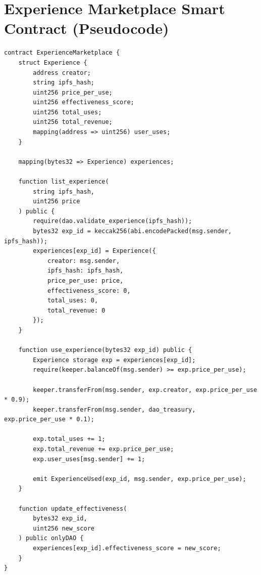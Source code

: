 \section{Experience Marketplace Smart Contract (Pseudocode)}


\begin{verbatim}
contract ExperienceMarketplace {
    struct Experience {
        address creator;
        string ipfs_hash;
        uint256 price_per_use;
        uint256 effectiveness_score;
        uint256 total_uses;
        uint256 total_revenue;
        mapping(address => uint256) user_uses;
    }

    mapping(bytes32 => Experience) experiences;

    function list_experience(
        string ipfs_hash,
        uint256 price
    ) public {
        require(dao.validate_experience(ipfs_hash));
        bytes32 exp_id = keccak256(abi.encodePacked(msg.sender, ipfs_hash));
        experiences[exp_id] = Experience({
            creator: msg.sender,
            ipfs_hash: ipfs_hash,
            price_per_use: price,
            effectiveness_score: 0,
            total_uses: 0,
            total_revenue: 0
        });
    }

    function use_experience(bytes32 exp_id) public {
        Experience storage exp = experiences[exp_id];
        require(keeper.balanceOf(msg.sender) >= exp.price_per_use);

        keeper.transferFrom(msg.sender, exp.creator, exp.price_per_use * 0.9);
        keeper.transferFrom(msg.sender, dao_treasury, exp.price_per_use * 0.1);

        exp.total_uses += 1;
        exp.total_revenue += exp.price_per_use;
        exp.user_uses[msg.sender] += 1;

        emit ExperienceUsed(exp_id, msg.sender, exp.price_per_use);
    }

    function update_effectiveness(
        bytes32 exp_id,
        uint256 new_score
    ) public onlyDAO {
        experiences[exp_id].effectiveness_score = new_score;
    }
}
\end{verbatim}

